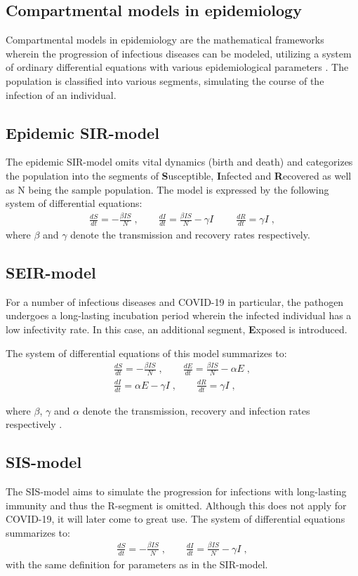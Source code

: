 \documentclass[12pt]{article}
\begin{document}
\subsection{Compartmental models in epidemiology}
Compartmental models in epidemiology are the mathematical frameworks 
wherein the progression of infectious diseases can be modeled, utilizing 
a system of ordinary differential equations with various epidemiological 
parameters \cite{söder}. The population is classified into various segments, 
simulating the course of the infection of an individual.
\subsection{Epidemic SIR-model}
The epidemic SIR-model omits vital dynamics (birth and death) 
and categorizes the population into the segments of \textbf{S}usceptible, 
\textbf{I}nfected and \textbf{R}ecovered
as well as N being the sample population. 
The model is expressed by the following system of differential equations:
\begin{align}
\frac{dS}{dt} = - \frac{\beta I S}{N} \;, \qquad
\frac{dI}{dt} = \frac{\beta I S}{N}- \gamma I \; \qquad
\frac{dR}{dt} = \gamma I \;,
\end{align}
\noindent where $\beta$ and $\gamma$ 
denote the transmission and recovery rates respectively.
\subsection{SEIR-model}
For a number of infectious diseases and COVID-19 in particular, 
the pathogen undergoes a long-lasting incubation period wherein 
the infected individual has a low infectivity rate. In this case, 
an additional segment, \textbf{E}xposed is introduced.

\newpage 
\noindent 
The system of differential equations of this model summarizes to:
\begin{gather}
\frac{dS}{dt} = - \frac{\beta I S}{N} \;, \qquad
\frac{dE}{dt} = \frac{\beta I S}{N}- \alpha E \;, \\
\frac{dI}{dt} = \alpha E - \gamma I \;, \qquad 
\frac{dR}{dt} = \gamma I \;,
\end{gather}

\noindent where $\beta$, $\gamma$ and $\alpha$ 
denote the transmission,  recovery and infection 
rates respectively \cite{gill}.

\subsection{SIS-model}
The SIS-model aims to simulate the progression for infections 
with long-lasting immunity and thus the R-segment is omitted. 
Although this does not apply for COVID-19, it will later come 
to great use. The system of differential equations summarizes to:
\begin{align}
\frac{dS}{dt} = - \frac{\beta I S}{N} \;, \qquad
\frac{dI}{dt} = \frac{\beta I S}{N}- \gamma I \;, 
\end{align}
with the same definition for parameters as in the SIR-model.
\end{document}

